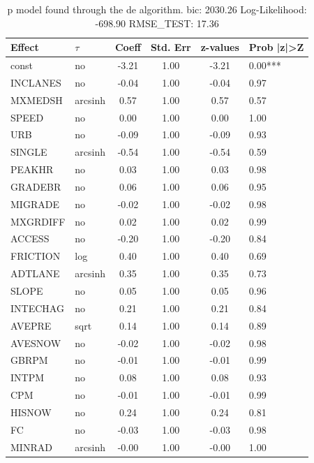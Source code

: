 \begin{table}
	\caption{p model found through the de algorithm. bic: 2030.26 Log-Likelihood: -698.90 RMSE_TEST: 17.36}
	\begin{center}
		\begin{tabular}{|l|l|c|c|c|l|}
			\hline
			Effect & $\tau$ & Coeff & Std. Err & z-values & Prob |z|>Z \\
			\hline
			const & no & -3.21 & 1.00 & -3.21 & 0.00*** \\
			\hline
			INCLANES & no & -0.04 & 1.00 & -0.04 & 0.97 \\
			\hline
			MXMEDSH & arcsinh & 0.57 & 1.00 & 0.57 & 0.57 \\
			\hline
			SPEED & no & 0.00 & 1.00 & 0.00 & 1.00 \\
			\hline
			URB & no & -0.09 & 1.00 & -0.09 & 0.93 \\
			\hline
			SINGLE & arcsinh & -0.54 & 1.00 & -0.54 & 0.59 \\
			\hline
			PEAKHR & no & 0.03 & 1.00 & 0.03 & 0.98 \\
			\hline
			GRADEBR & no & 0.06 & 1.00 & 0.06 & 0.95 \\
			\hline
			MIGRADE & no & -0.02 & 1.00 & -0.02 & 0.98 \\
			\hline
			MXGRDIFF & no & 0.02 & 1.00 & 0.02 & 0.99 \\
			\hline
			ACCESS & no & -0.20 & 1.00 & -0.20 & 0.84 \\
			\hline
			FRICTION & log & 0.40 & 1.00 & 0.40 & 0.69 \\
			\hline
			ADTLANE & arcsinh & 0.35 & 1.00 & 0.35 & 0.73 \\
			\hline
			SLOPE & no & 0.05 & 1.00 & 0.05 & 0.96 \\
			\hline
			INTECHAG & no & 0.21 & 1.00 & 0.21 & 0.84 \\
			\hline
			AVEPRE & sqrt & 0.14 & 1.00 & 0.14 & 0.89 \\
			\hline
			AVESNOW & no & -0.02 & 1.00 & -0.02 & 0.98 \\
			\hline
			GBRPM & no & -0.01 & 1.00 & -0.01 & 0.99 \\
			\hline
			INTPM & no & 0.08 & 1.00 & 0.08 & 0.93 \\
			\hline
			CPM & no & -0.01 & 1.00 & -0.01 & 0.99 \\
			\hline
			HISNOW & no & 0.24 & 1.00 & 0.24 & 0.81 \\
			\hline
			FC & no & -0.03 & 1.00 & -0.03 & 0.98 \\
			\hline
			MINRAD & arcsinh & -0.00 & 1.00 & -0.00 & 1.00 \\

\end{tabular}
\end{center}
\end{table}
